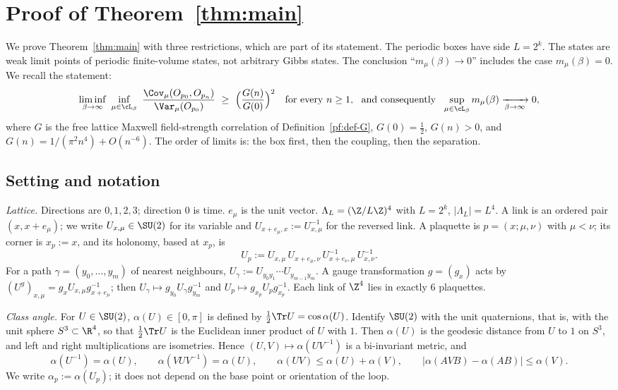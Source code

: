 \section{Proof of Theorem~\ref{thm:main}}\label{sec:proof}

We prove Theorem~\ref{thm:main} with three restrictions, which are part of its statement.
The periodic boxes have side $L=2^k$.
The states are weak limit points of periodic finite-volume states, not arbitrary Gibbs states.
The conclusion ``$m_\mu(\beta)\to0$'' includes the case $m_\mu(\beta)=0$.
We recall the statement:
\begin{equation}\label{pf:eq-main}
\liminf_{\beta\to\infty}\ \inf_{\mu\in\cL_\beta}\ \frac{\Cov_\mu(O_{p_0},O_{p_n})}{\Var_\mu(O_{p_0})}\ \ge\ \Big(\frac{G(n)}{G(0)}\Big)^2\quad\text{for every } n\ge1,
\ \text{ and consequently }\ \sup_{\mu\in\cL_\beta}m_\mu(\beta)\xrightarrow[\beta\to\infty]{}0,
\end{equation}
where $G$ is the free lattice Maxwell field-strength correlation of Definition~\ref{pf:def-G}, $G(0)=\tfrac12$, $G(n)>0$, and $G(n)=1/(\pi^2n^4)+O(n^{-6})$.
The order of limits is: the box first, then the coupling, then the separation.

\subsection{Setting and notation}\label{pf:sec-setting}

\emph{Lattice.} Directions are $0,1,2,3$; direction $0$ is time. $e_\mu$ is the unit vector. $\Lambda_L=(\Z/L\Z)^4$ with $L=2^k$, $|\Lambda_L|=L^4$. A link is an ordered pair $(x,x+e_\mu)$; we write $U_{x,\mu}\in\SU(2)$ for its variable and $U_{x+e_\mu,x}:=U_{x,\mu}^{-1}$ for the reversed link. A plaquette is $p=(x;\mu,\nu)$ with $\mu<\nu$; its corner is $x_p:=x$, and its holonomy, based at $x_p$, is
\[
U_p:=U_{x,\mu}\,U_{x+e_\mu,\nu}\,U_{x+e_\nu,\mu}^{-1}\,U_{x,\nu}^{-1}.
\]
For a path $\gamma=(y_0,\dots,y_m)$ of nearest neighbours, $U_\gamma:=U_{y_0y_1}\cdots U_{y_{m-1}y_m}$.
A gauge transformation $g=(g_x)$ acts by $(U^g)_{x,\mu}=g_xU_{x,\mu}g_{x+e_\mu}^{-1}$; then $U_\gamma\mapsto g_{y_0}U_\gamma g_{y_m}^{-1}$ and $U_p\mapsto g_{x_p}U_pg_{x_p}^{-1}$.
Each link of $\Z^4$ lies in exactly $6$ plaquettes.

\emph{Class angle.} For $U\in\SU(2)$, $\alpha(U)\in[0,\pi]$ is defined by $\tfrac12\Tr U=\cos\alpha(U)$.
Identify $\SU(2)$ with the unit quaternions, that is, with the unit sphere $S^3\subset\R^4$, so that $\tfrac12\Tr U$ is the Euclidean inner product of $U$ with $1$. Then $\alpha(U)$ is the geodesic distance from $U$ to $1$ on $S^3$, and left and right multiplications are isometries. Hence $(U,V)\mapsto\alpha(UV^{-1})$ is a bi-invariant metric, and
\begin{equation}\label{pf:eq-alpha}
\alpha(U^{-1})=\alpha(U),\qquad \alpha(VUV^{-1})=\alpha(U),\qquad \alpha(UV)\le\alpha(U)+\alpha(V),\qquad |\alpha(AVB)-\alpha(AB)|\le\alpha(V).
\end{equation}
We write $\alpha_p:=\alpha(U_p)$; it does not depend on the base point or orientation of the loop.

